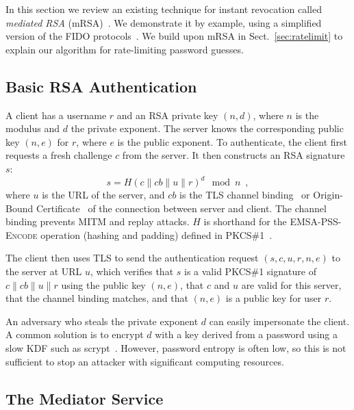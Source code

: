 \documentclass{llncs}
\newcommand*{\concat}{\mathbin{\|}}
\begin{document}
In this section we review an existing technique for instant revocation called \emph{mediated RSA}
(mRSA)~\cite{Boneh01,Kutyiowski12}. We demonstrate it by example, using a simplified version of the
FIDO protocols~\cite{FIDOOverview}. We build upon mRSA in Sect.~\ref{sec:ratelimit} to explain our
algorithm for rate-limiting password guesses.

\subsection{Basic RSA Authentication}\label{sec:signature}

A client has a username $r$ and an RSA private key $(n, d)$, where $n$ is the modulus and $d$ the
private exponent. The server knows the corresponding public key $(n, e)$ for $r$, where $e$ is the
public exponent. To authenticate, the client first requests a fresh challenge $c$ from the server.
It then constructs an RSA signature $s$:
\begin{equation}\label{eq:signature}
s = H(c \concat \mathit{cb} \concat u \concat r)^d \mod n \enspace,
\end{equation}
where $u$ is the URL of the server, and $\mathit{cb}$ is the TLS channel
binding~\cite{ChannelBinding} or Origin-Bound Certificate~\cite{Dietz12} of the connection between
server and client. The channel binding prevents MITM and replay attacks. $H$ is shorthand for the
\textsc{EMSA-PSS-Encode} operation (hashing and padding) defined in PKCS\#1~\cite{PKCS1}.

The client then uses TLS to send the authentication request $(s, c, u, r, n, e)$ to the server at
URL $u$, which verifies that $s$ is a valid PKCS\#1 signature of
$c \concat \mathit{cb} \concat u \concat r$ using the public key $(n, e)$, that $c$ and $u$ are
valid for this server, that the channel binding matches, and that $(n, e)$ is a public key for user
$r$.

An adversary who steals the private exponent $d$ can easily impersonate the client. A common
solution is to encrypt $d$ with a key derived from a password using a slow KDF such as
scrypt~\cite{Percival09}. However, password entropy is often low, so this is not sufficient to stop
an attacker with significant computing resources.

\subsection{The Mediator Service}\label{sec:mediator}
\end{document}
